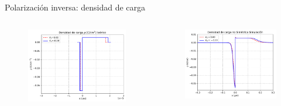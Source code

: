 \documentclass[aspectratio=169,xcolor=dvipsnames]{beamer}
\begin{document}
\begin{frame}{Polarización inversa: densidad de carga}
    \begin{columns}
        \begin{column}{0.5\textwidth}
            \begin{figure}
                \includegraphics[width=0.90\linewidth]{Teorico/Densidad_Carga-Inversa.pdf}
            \end{figure}
        \end{column}
        \begin{column}{0.5\textwidth}
            \begin{figure}
                \includegraphics[width=0.90\linewidth]{Inversa/Densidad_Carga-Inversa.pdf}
            \end{figure}
        \end{column}
        \end{columns}

\end{frame}
\end{document}
